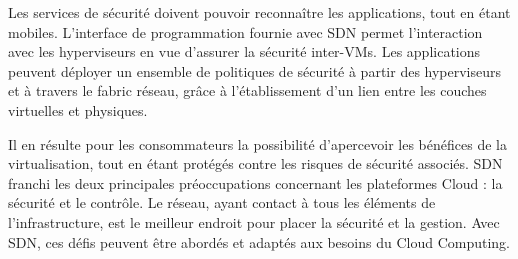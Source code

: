 Les services de sécurité doivent pouvoir reconnaître les applications, tout en étant mobiles. L'interface de programmation fournie avec SDN permet l'interaction avec les hyperviseurs en vue d'assurer la sécurité inter-VMs. Les applications peuvent déployer un ensemble de politiques de sécurité à partir des hyperviseurs et à travers le \gls{fabric} réseau, grâce à l'établissement d'un lien entre les couches virtuelles et physiques. 

Il en résulte pour les consommateurs la possibilité d'apercevoir les bénéfices de la virtualisation, tout en étant protégés contre les risques de sécurité associés. SDN franchi les deux principales préoccupations concernant les plateformes Cloud : la sécurité et le contrôle. Le réseau, ayant contact à tous les éléments de l'infrastructure, est le meilleur endroit pour placer la sécurité et la gestion. Avec SDN, ces défis peuvent être abordés et adaptés aux besoins du Cloud Computing. \cite{cloudSecurityThreats} \cite{bigSwitchTapModernDC} \cite{zkCloudIntelligentNetwork}

